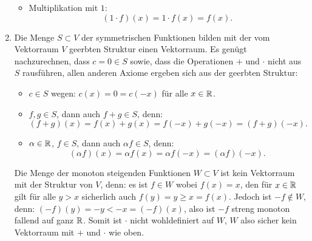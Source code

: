 \documentclass{theozettel}
\begin{document}
\begin{enumerate}
\begin{itemize}
				\item 	Multiplikation mit $1$:
						\[
							(1 \cdot f)(x) = 1 \cdot f(x) = f(x).
						\]
			\end{itemize}
	
	\item 	Die Menge $S \subset V$ der symmetrischen Funktionen bilden mit der vom Vektorraum $V$ geerbten Struktur einen Vektorraum. Es genügt nachzurechnen, dass $c = 0 \in S$ sowie, dass die Operationen $+$ und $\cdot$ nicht aus $S$ rausführen, allen anderen Axiome ergeben sich aus der geerbten Struktur:
			\begin{itemize}
				\item 	$c \in S$ wegen: $c(x) = 0 = c(-x)$ für alle $x \in \mathbb{R}$.
				
				\item 	$f,g \in S$, dann auch $f+g \in S$, denn:
						\[
							(f+g)(x) = f(x) + g(x) = f(-x) + g(-x) = (f+g)(-x).
						\]
				
				\item 	$\alpha \in \mathbb{R}$, $f \in S$, dann auch $\alpha f \in S$, denn:
						\[
							(\alpha f)(x) = \alpha f(x) = \alpha f(-x) = (\alpha f)(-x).
						\]
			\end{itemize}
			Die Menge der monoton steigenden Funktionen $W \subset V$ ist kein Vektorraum mit der Struktur von $V$, denn: es ist $f \in W$ wobei $f(x) = x$, den für $x \in \mathbb{R}$ gilt für alle $y > x$ sicherlich auch $f(y) = y \geq x = f(x)$. Jedoch ist $-f \notin W$, denn: $(-f)(y) = -y < -x = (-f)(x)$, also ist $-f$ streng monoton fallend auf ganz $\mathbb{R}$. Somit ist $\cdot$ nicht wohldefiniert auf $W$, $W$ also sicher kein Vektorraum mit $+$ und $\cdot $ wie oben.
\end{enumerate}
\end{document}
